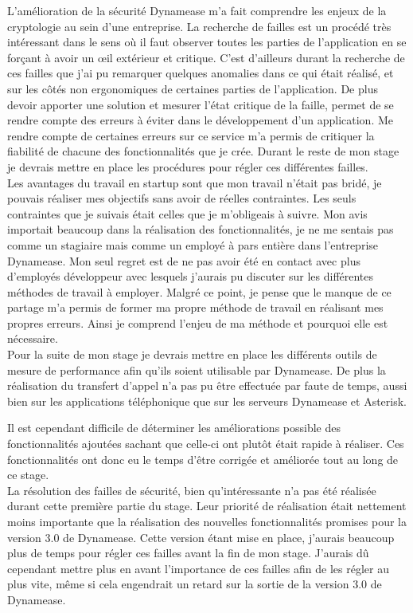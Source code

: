 L'amélioration de la sécurité Dynamease m'a fait comprendre les enjeux de la cryptologie au sein d'une entreprise. La recherche de failles est un procédé très intéressant dans le sens où il faut observer toutes les parties de l'application en se forçant à avoir un œil extérieur et critique. C'est d’ailleurs durant la recherche de ces failles que j'ai pu remarquer quelques anomalies dans ce qui était réalisé, et sur les côtés non ergonomiques de certaines parties de l'application. De plus devoir apporter une solution et mesurer l'état critique de la faille, permet de se rendre compte des erreurs à éviter dans le développement d'un application. Me rendre compte de certaines erreurs sur ce service m'a permis de critiquer la fiabilité de chacune des fonctionnalités que je crée. Durant le reste de mon stage je devrais mettre en place les procédures pour régler ces différentes failles.\\

Les avantages du travail en startup sont que mon travail n'était pas bridé, je pouvais réaliser mes objectifs sans avoir de réelles contraintes. Les seuls contraintes que je suivais était celles que je m'obligeais à suivre. Mon avis importait beaucoup dans la réalisation des fonctionnalités, je ne me sentais pas comme un stagiaire mais comme un employé à pars entière dans l'entreprise Dynamease. Mon seul regret est de ne pas avoir été en contact avec plus d'employés développeur avec lesquels j'aurais pu discuter sur les différentes méthodes de travail à employer. Malgré ce point, je pense que le manque de ce partage m'a permis de former ma propre méthode de travail en réalisant mes propres erreurs. Ainsi je comprend l'enjeu de ma méthode et pourquoi elle est nécessaire.\\

Pour la suite de mon stage je devrais mettre en place les différents outils de mesure de performance afin qu'ils soient utilisable par Dynamease. De plus la réalisation du transfert d'appel n'a pas pu être effectuée par faute de temps, aussi bien sur les applications téléphonique que sur les serveurs Dynamease et Asterisk.

Il est cependant difficile de déterminer les améliorations possible des fonctionnalités ajoutées sachant que celle-ci ont plutôt était rapide à réaliser. Ces fonctionnalités ont donc eu le temps d'être corrigée et améliorée tout au long de ce stage.\\

La résolution des failles de sécurité, bien qu’intéressante n'a pas été réalisée durant cette première partie du stage. Leur priorité de réalisation était nettement moins importante que la réalisation des nouvelles fonctionnalités promises pour la version 3.0 de Dynamease. Cette version étant mise en place, j'aurais beaucoup plus de temps pour régler ces failles avant la fin de mon stage. J'aurais dû cependant mettre plus en avant l'importance de ces failles afin de les régler au plus vite, même si cela engendrait un retard sur la sortie de la version 3.0 de Dynamease. 